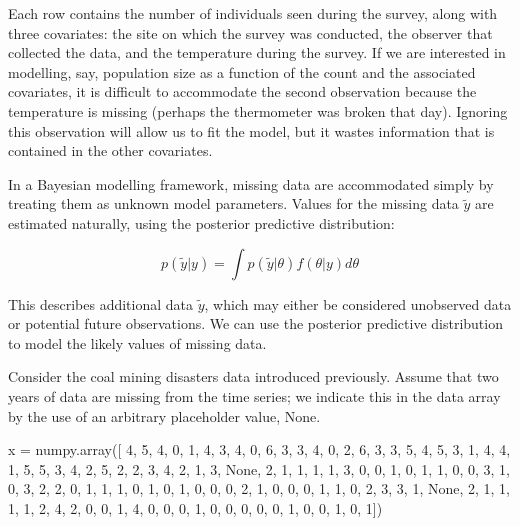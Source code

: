 \documentclass[]{jss}
\begin{document}
Each row contains the number of individuals seen during the survey, along with three covariates: the site on which the survey was conducted, the observer that collected the data, and the temperature during the survey. If we are interested in modelling, say, population size as a function of the count and the associated covariates, it is difficult to accommodate the second observation because the temperature is missing (perhaps the thermometer was broken that day). Ignoring this observation will allow us to fit the model, but it wastes information that is contained in the other covariates.

In a Bayesian modelling framework, missing data are accommodated simply by treating them as unknown model parameters. Values for the missing data $\tilde{y}$ are estimated naturally, using the posterior predictive distribution:

\begin{equation}
  p(\tilde{y}|y) = \int p(\tilde{y}|\theta) f(\theta|y) d\theta
\end{equation}

This describes additional data $\tilde{y}$, which may either be considered unobserved data or potential future observations. We can use the posterior predictive distribution to model the likely values of missing data.

Consider the coal mining disasters data introduced previously. Assume that two years of data are missing from the time series; we indicate this in the data array by the use of an arbitrary placeholder value, None.

\begin{CodeInput}
x = numpy.array([ 4, 5, 4, 0, 1, 4, 3, 4, 0, 6, 3, 3, 4, 0, 2, 6,
3, 3, 5, 4, 5, 3, 1, 4, 4, 1, 5, 5, 3, 4, 2, 5,
2, 2, 3, 4, 2, 1, 3, None, 2, 1, 1, 1, 1, 3, 0, 0,
1, 0, 1, 1, 0, 0, 3, 1, 0, 3, 2, 2, 0, 1, 1, 1,
0, 1, 0, 1, 0, 0, 0, 2, 1, 0, 0, 0, 1, 1, 0, 2,
3, 3, 1, None, 2, 1, 1, 1, 1, 2, 4, 2, 0, 0, 1, 4,
0, 0, 0, 1, 0, 0, 0, 0, 0, 1, 0, 0, 1, 0, 1])
\end{CodeInput}
\end{document}

